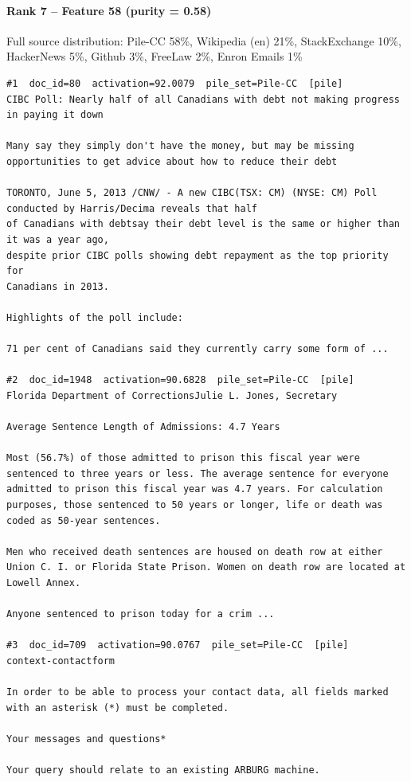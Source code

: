 \paragraph*{Rank 7 -- Feature 58 (purity = 0.58)}

Full source distribution: Pile-CC 58\%, Wikipedia (en) 21\%, StackExchange 10\%, HackerNews 5\%, Github 3\%, FreeLaw 2\%, Enron Emails 1\%

\begin{verbatim}
#1  doc_id=80  activation=92.0079  pile_set=Pile-CC  [pile]
CIBC Poll: Nearly half of all Canadians with debt not making progress in paying it down

Many say they simply don't have the money, but may be missing
opportunities to get advice about how to reduce their debt

TORONTO, June 5, 2013 /CNW/ - A new CIBC(TSX: CM) (NYSE: CM) Poll conducted by Harris/Decima reveals that half
of Canadians with debtsay their debt level is the same or higher than it was a year ago,
despite prior CIBC polls showing debt repayment as the top priority for
Canadians in 2013.

Highlights of the poll include:

71 per cent of Canadians said they currently carry some form of ...

#2  doc_id=1948  activation=90.6828  pile_set=Pile-CC  [pile]
Florida Department of CorrectionsJulie L. Jones, Secretary

Average Sentence Length of Admissions: 4.7 Years

Most (56.7%) of those admitted to prison this fiscal year were sentenced to three years or less. The average sentence for everyone admitted to prison this fiscal year was 4.7 years. For calculation purposes, those sentenced to 50 years or longer, life or death was coded as 50-year sentences.

Men who received death sentences are housed on death row at either Union C. I. or Florida State Prison. Women on death row are located at Lowell Annex.

Anyone sentenced to prison today for a crim ...

#3  doc_id=709  activation=90.0767  pile_set=Pile-CC  [pile]
context-contactform

In order to be able to process your contact data, all fields marked with an asterisk (*) must be completed.

Your messages and questions*

Your query should relate to an existing ARBURG machine.


\end{verbatim}
